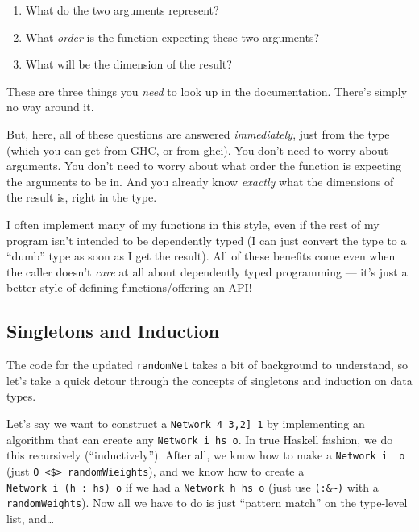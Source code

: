 \documentclass[]{article}
\begin{document}
\begin{enumerate}
\def\labelenumi{\arabic{enumi}.}
\tightlist
\item
  What do the two arguments represent?
\item
  What \emph{order} is the function expecting these two arguments?
\item
  What will be the dimension of the result?
\end{enumerate}

These are three things you \emph{need} to look up in the documentation.
There's simply no way around it.

But, here, all of these questions are answered \emph{immediately}, just
from the type (which you can get from GHC, or from ghci). You don't need
to worry about arguments. You don't need to worry about what order the
function is expecting the arguments to be in. And you already know
\emph{exactly} what the dimensions of the result is, right in the type.

I often implement many of my functions in this style, even if the rest
of my program isn't intended to be dependently typed (I can just convert
the type to a ``dumb'' type as soon as I get the result). All of these
benefits come even when the caller doesn't \emph{care} at all about
dependently typed programming --- it's just a better style of defining
functions/offering an API!

\subsection{Singletons and Induction}\label{singletons-and-induction}

The code for the updated \texttt{randomNet} takes a bit of background to
understand, so let's take a quick detour through the concepts of
singletons and induction on data types.

Let's say we want to construct a
\texttt{Network\ 4\ \textquotesingle{}{[}3,2{]}\ 1} by implementing an
algorithm that can create any \texttt{Network\ i\ hs\ o}. In true
Haskell fashion, we do this recursively (``inductively''). After all, we
know how to make a \texttt{Network\ i\ \textquotesingle{}{[}{]}\ o}
(just \texttt{O\ \textless{}\$\textgreater{}\ randomWieights}), and we
know how to create a
\texttt{Network\ i\ (h\ \textquotesingle{}:\ hs)\ o} if we had a
\texttt{Network\ h\ hs\ o} (just use \texttt{(:\&\textasciitilde{})}
with a \texttt{randomWeights}). Now all we have to do is just ``pattern
match'' on the type-level list, and\ldots{}
\end{document}
